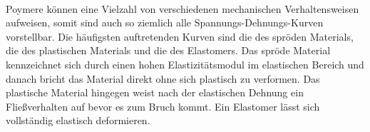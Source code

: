 \documentclass[11pt,a4paper]{article}
\numberwithin{equation}{section}
\numberwithin{figure}{section}
\begin{document}
\\
\begin{addmargin}[25pt]{0pt}
Poymere können eine Vielzahl von verschiedenen mechanischen Verhaltensweisen aufweisen, somit sind auch so ziemlich alle Spannungs-Dehnungs-Kurven vorstellbar. Die häufigsten auftretenden Kurven sind die des spröden Materials, die des plastischen Materials und die des Elastomers. Das spröde Material kennzeichnet sich durch einen hohen Elastizitätsmodul im elastischen Bereich und danach bricht das Material direkt ohne sich plastisch zu verformen. Das plastische Material hingegen weist nach der elastischen Dehnung ein Fließverhalten auf bevor es zum Bruch kommt. Ein Elastomer lässt sich vollständig elastisch deformieren.\\
\end{addmargin}
\end{document}
